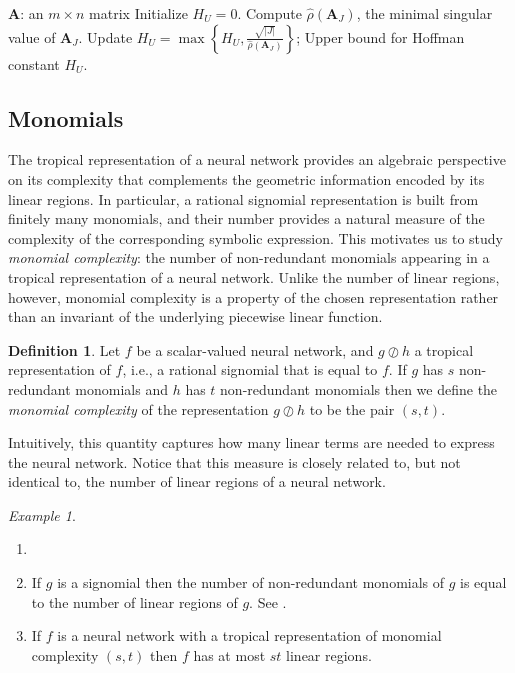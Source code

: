 \documentclass[10pt]{article}
\theoremstyle{definition}
\newtheorem{definition}[theorem]{Definition}
\theoremstyle{remark}
\newtheorem{example}[theorem]{Example}
\def\mA{{\bm{A}}}
\begin{document}
\begin{algorithm}[ht]
  \caption{Upper bound for Hoffman constant}
    \begin{algorithmic}[1]
        \Require $\mA$: an $m\times n$ matrix
        \State Initialize $H_U=0$.
        \For{$J\in\mathcal{D}(\mA),\ J\ne\varnothing$}
            \State Compute $\hat\rho(\mA_J)$, the minimal singular value of $\mA_J$.
            \State Update $H_U=\max\left\{H_U,\frac{\sqrt{|J|}}{\hat\rho(\mA_J)}\right\}$;
        \EndFor
        \State \Return Upper bound for Hoffman constant $H_U$.
    \end{algorithmic}
    \label{alg:upper_hoffman}
\end{algorithm}

\subsection{Monomials} \label{subsec:monomials}

The tropical representation of a neural network provides an algebraic perspective on its complexity that complements the geometric information encoded by its linear regions. In particular, a rational signomial
representation is built from finitely many monomials, and their number provides a natural measure of the complexity of the corresponding symbolic expression. This motivates us to study \emph{monomial complexity}: the number of non-redundant monomials appearing in a tropical representation of a neural network. Unlike the number of linear regions, however, monomial
complexity is a property of the chosen representation rather than an invariant of the underlying piecewise linear function.

\begin{definition}
    Let $f$ be a scalar-valued neural network, and $g \oslash h$ a tropical representation of $f$, i.e., a rational signomial that is equal to $f$. If $g$ has $s$ non-redundant monomials and $h$ has $t$ non-redundant monomials then we define the \emph{monomial complexity} of the representation $g \oslash h$ to be the pair $(s, t)$.
\end{definition}

Intuitively, this quantity captures how many linear terms are needed to express the neural network.
Notice that this measure is closely related to, but not identical to, the number of linear regions of a neural network.

\begin{example}
    \begin{enumerate}
        \item[]
        \item If $g$ is a signomial then the number of non-redundant monomials of $g$ is equal to the number of linear regions of $g$. See .
        \item If $f$ is a neural network with a tropical representation of monomial complexity $(s, t)$ then $f$ has at most $st$ linear regions.
    \end{enumerate}
\end{example}
\end{document}

